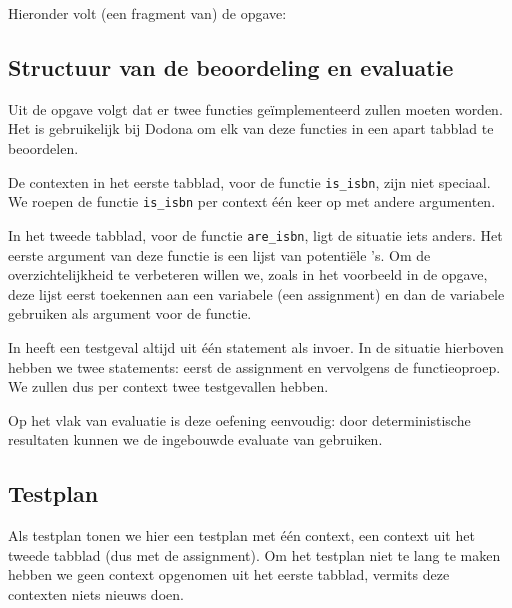 Hieronder volt (een fragment van) de opgave:

\begin{quote}
\end{quote}


\subsection{Structuur van de beoordeling en evaluatie}\label{subsec:oefening-isbn-structuur}

Uit de opgave volgt dat er twee functies geïmplementeerd zullen moeten worden.
Het is gebruikelijk bij Dodona om elk van deze functies in een apart tabblad te beoordelen.

De contexten in het eerste tabblad, voor de functie \texttt{is\_isbn}, zijn niet speciaal.
We roepen de functie \texttt{is\_isbn} per context één keer op met andere argumenten.

In het tweede tabblad, voor de functie \texttt{are\_isbn}, ligt de situatie iets anders.
Het eerste argument van deze functie is een lijst van potentiële 's.
Om de overzichtelijkheid te verbeteren willen we, zoals in het voorbeeld in de opgave, deze lijst eerst toekennen aan een variabele (een assignment) en dan de variabele gebruiken als argument voor de functie.

In \tested{} heeft een testgeval altijd uit één statement als invoer.
In de situatie hierboven hebben we twee statements: eerst de assignment en vervolgens de functieoproep.
We zullen dus per context twee testgevallen hebben.

Op het vlak van evaluatie is deze oefening eenvoudig: door deterministische resultaten kunnen we de ingebouwde evaluate van \tested{} gebruiken.

\subsection{Testplan}\label{subsec:oefening-isbn-testplan}

Als testplan tonen we hier een testplan met één context, een context uit het tweede tabblad (dus met de assignment).
Om het testplan niet te lang te maken hebben we geen context opgenomen uit het eerste tabblad, vermits deze contexten niets nieuws doen.

\inputminted{json}{sources/isbn-plan.tson}
